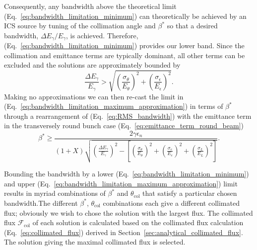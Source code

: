 \documentclass[../main.tex]{subfiles}
\begin{document}
Consequently, any bandwidth above the theoretical limit (Eq.~\ref{eq:bandwidth_limitation_minimum}) can theoretically be achieved by an ICS source by tuning of the collimation angle and $\beta^{*}$ so that a desired bandwidth, $\Delta E_{\gamma}/E_{\gamma}$, is achieved. Therefore, (Eq.~\ref{eq:bandwidth_limitation_minimum}) provides our lower band. Since the collimation and emittance terms are typically dominant, all other terms can be excluded and the solutions are approximately bounded by
\begin{equation}
\frac{\Delta E_{\gamma}}{E_{\gamma}} > \sqrt{\left(\frac{ \sigma_{\theta}}{E_{\theta}}\right)^{2}+\left(\frac{\sigma_{\epsilon}}{E_{\epsilon}}\right)^{2}}.
\label{eq:bandwidth_limitation_maximum_approximation}
\end{equation}
Making no approximations we can then re-cast the limit in (Eq.~\ref{eq:bandwidth_limitation_maximum_approximation}) in terms of $\beta^{*}$ through a rearrangement of (Eq.~\ref{eq:RMS_bandwidth}) with the emittance term in the transversely round bunch case (Eq.~\ref{eq:emittance_term_round_beam})
\begin{equation}
\beta^{*} \geq \frac{2\gamma\epsilon_{n}}{\left(1+X\right)\sqrt{\left(\frac{\Delta E_{\gamma}}{E_{\gamma}}\right)^{2}-\left[\left(\frac{\sigma_{\theta}}{E_{\theta}}\right)^{2}+\left(\frac{\sigma_{e}}{E_{e}}\right)^{2}+\left(\frac{\sigma_{L}}{E_{L}}\right)^{2}\right]}}.
\label{eq:beta_star_maximum limitation}
\end{equation}

Bounding the  bandwidth by a lower (Eq.~\ref{eq:bandwidth_limitation_minimum}) and upper (Eq.~\ref{eq:bandwidth_limitation_maximum_approximation}) limit results in myriad combinations of $\beta^{*}$ and $\theta_{\mathrm{col}}$ that satisfy a particular chosen bandwidth.The different $\beta^{*}$, $\theta_{\mathrm{col}}$ combinations each give a different collimated flux; obviously we wish to chose the solution with the largest flux. The collimated flux $\mathcal{F}_{\mathrm{col}}$ of each solution is calculated based on the collimated flux calculation (Eq.~\ref{eq:collimated_flux}) derived in Section~\ref{sec:analytical_collimated_flux}. The solution giving the maximal collimated flux is selected. 
\end{document}
